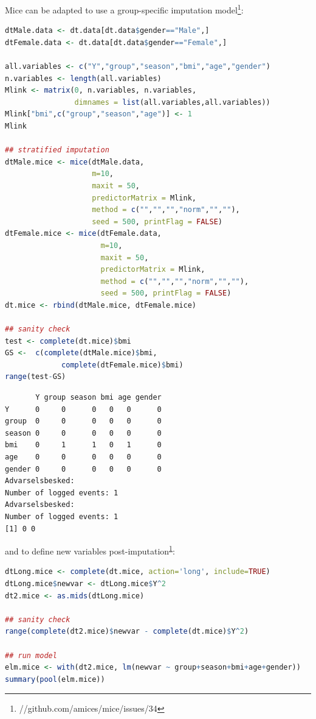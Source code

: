 \documentclass[12pt]{article}
\begin{document}
Mice can be adapted to use a group-specific imputation model\footnote{//github.com/amices/mice/issues/34\label{org7e29c1c}}:
\begin{lstlisting}[language=r,numbers=none]
dtMale.data <- dt.data[dt.data$gender=="Male",]
dtFemale.data <- dt.data[dt.data$gender=="Female",]

all.variables <- c("Y","group","season","bmi","age","gender")
n.variables <- length(all.variables)
Mlink <- matrix(0, n.variables, n.variables,
                dimnames = list(all.variables,all.variables))
Mlink["bmi",c("group","season","age")] <- 1
Mlink

## stratified imputation
dtMale.mice <- mice(dtMale.data,
                    m=10, 
                    maxit = 50, 
                    predictorMatrix = Mlink,
                    method = c("","","","norm","",""),
                    seed = 500, printFlag = FALSE)
dtFemale.mice <- mice(dtFemale.data,
                      m=10, 
                      maxit = 50,
                      predictorMatrix = Mlink,
                      method = c("","","","norm","",""),
                      seed = 500, printFlag = FALSE)
dt.mice <- rbind(dtMale.mice, dtFemale.mice)

## sanity check
test <- complete(dt.mice)$bmi
GS <-  c(complete(dtMale.mice)$bmi,
             complete(dtFemale.mice)$bmi)
range(test-GS)
\end{lstlisting}

\label{}
\begin{verbatim}
       Y group season bmi age gender
Y      0     0      0   0   0      0
group  0     0      0   0   0      0
season 0     0      0   0   0      0
bmi    0     1      1   0   1      0
age    0     0      0   0   0      0
gender 0     0      0   0   0      0
Advarselsbesked:
Number of logged events: 1
Advarselsbesked:
Number of logged events: 1
[1] 0 0
\end{verbatim}

and to define new variables post-imputation\textsuperscript{\ref{org7e29c1c}}:
\begin{lstlisting}[language=r,numbers=none]
dtLong.mice <- complete(dt.mice, action='long', include=TRUE)
dtLong.mice$newvar <- dtLong.mice$Y^2
dt2.mice <- as.mids(dtLong.mice)

## sanity check
range(complete(dt2.mice)$newvar - complete(dt.mice)$Y^2)

## run model
elm.mice <- with(dt2.mice, lm(newvar ~ group+season+bmi+age+gender))
summary(pool(elm.mice))
\end{lstlisting}
\end{document}
